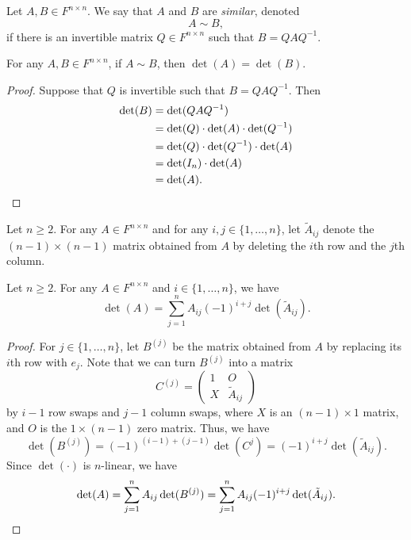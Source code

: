 \begin{definition}
  Let $A, B \in F^{n \times n}$.
  We say that $A$ and $B$ are \emph{similar}, denoted
  \begin{equation*}
    A \sim B,
  \end{equation*}
  if there is an invertible matrix $Q \in F^{n \times n}$ such that
  $B = QAQ^{-1}$.
\end{definition}

\begin{theorem}
  For any $A, B \in F^{n \times n}$, if $A \sim B$, then $\det(A) = \det(B)$.
\end{theorem}
\begin{proof}
  Suppose that $Q$ is invertible such that $B = QAQ^{-1}$.
  Then
  \begin{align*}
    \det(B)
    &= \det(QAQ^{-1}) \\
    &= \det(Q) \cdot \det(A) \cdot \det(Q^{-1}) \\
    &= \det(Q) \cdot \det(Q^{-1}) \cdot \det(A) \\
    &= \det(I_n) \cdot \det(A) \\
    &= \det(A).
    \qedhere
  \end{align*}
\end{proof}

\begin{definition}
  Let $n \geq 2$.
  For any $A \in F^{n \times n}$ and for any $i, j \in \{1, \dots, n\}$,
  let $\tilde A_{ij}$ denote the $(n-1) \times (n-1)$ matrix obtained from $A$
  by deleting the $i$th row and the $j$th column.
\end{definition}

\begin{theorem}
  Let $n \geq 2$.
  For any $A \in F^{n \times n}$ and $i \in \{1, \dots, n\}$, we have
  \begin{equation*}
    \det(A) = \sum_{j=1}^n A_{ij} (-1)^{i+j} \det(\tilde A_{ij}).
  \end{equation*}
\end{theorem}
\begin{proof}
  For $j \in \{1, \dots, n\}$, let $B^{(j)}$ be the matrix obtained from $A$
  by replacing its $i$th row with $e_j$.
  Note that we can turn $B^{(j)}$ into a matrix
  \begin{equation*}
    C^{(j)} =
    \begin{pmatrix}
      1 & O \\
      X & \tilde A_{ij}
    \end{pmatrix}
  \end{equation*}
  by $i-1$ row swaps and $j-1$ column swaps, where $X$ is an $(n-1) \times 1$
  matrix, and $O$ is the $1 \times (n-1)$ zero matrix.
  Thus, we have
  \begin{equation*}
    \det(B^{(j)})
    = (-1)^{(i-1)+(j-1)} \det(C^{j})
    = (-1)^{i+j} \det(\tilde A_{ij}).
  \end{equation*}
  Since $\det(\cdot)$ is $n$-linear, we have
  \begin{equation*}
    \det(A)
    = \sum_{j=1}^n A_{ij} \det(B^{(j)})
    = \sum_{j=1}^n A_{ij} (-1)^{i+j} \det(\tilde A_{ij}).
    \qedhere
  \end{equation*}
\end{proof}